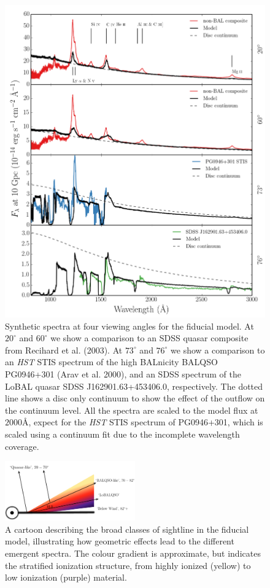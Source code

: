 \documentclass[useAMS,usenatbib]{mn2e_x}
\begin{document}
\begin{figure}
\centering
\includegraphics[width=1.0\textwidth]{figures/uvspec_new.png}
\caption
{
Synthetic spectra at four viewing angles for the fiducial model. At 
$20^\circ$ and $60^\circ$ we show a comparison to an SDSS quasar composite
from Recihard et al. (2003). At $73^\circ$ and $76^\circ$ we show a comparison to
an {\sl HST} STIS spectrum of the high BALnicity BALQSO 
PG0946+301 (Arav et al. 2000), and an SDSS spectrum of the LoBAL quasar 
SDSS J162901.63+453406.0, respectively. The dotted line shows a disc
only continuum to show the effect of the outflow on the continuum level. 
All the spectra are scaled to the model flux at $2000$\AA, expect for the 
{\sl HST} STIS spectrum of PG0946+301, which is scaled using a continuum fit
due to the incomplete wavelength coverage.
}
\label{fig:uvspec}
\end{figure}

\begin{figure} 
\centering
\includegraphics[width=0.5\textwidth]{figures/windnew3.png}
\caption
{
A cartoon describing the broad classes of sightline 
in the fiducial model, illustrating how geometric effects lead to 
the different emergent spectra. The colour gradient is approximate,
but indicates the stratified ionization structure, 
from highly ionized (yellow) to low ionization (purple) material.
}
\label{fig:sightline}
\end{figure} 
\end{document}
